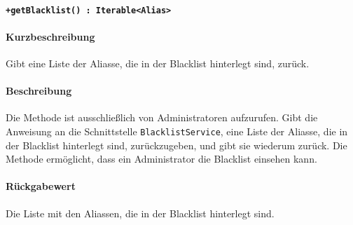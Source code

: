 \paragraph*{\texttt{+getBlacklist() : Iterable<Alias>}}%
\paragraph*{Kurzbeschreibung}
Gibt eine Liste der Aliasse, die in der Blacklist hinterlegt sind, zurück.
\paragraph*{Beschreibung}
Die Methode ist ausschließlich von Administratoren aufzurufen.
Gibt die Anweisung an die Schnittstelle \texttt{BlacklistService}, eine Liste der Aliasse, die in der Blacklist hinterlegt sind, zurückzugeben, und gibt sie wiederum zurück.
Die Methode ermöglicht, dass ein Administrator die Blacklist einsehen kann.
\paragraph*{Rückgabewert}
Die Liste mit den Aliassen, die in der Blacklist hinterlegt sind.
